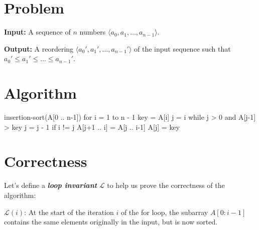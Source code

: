\documentclass[12pt]{article}
\begin{document}
\section*{Problem}

\noindent\textbf{Input:} A sequence of \(n\) numbers \(\langle a_0, a_1, \dots, a_{n-1} \rangle\).

\noindent\textbf{Output:} A reordering \(\langle a_0', a_1', \dots, a_{n-1}' \rangle\) of the input sequence such that \(a_0' \leq a_1' \leq \dots \leq a_{n-1}'\).

\section*{Algorithm}

\begin{pseudocode}
insertion-sort(A[0 .. n-1])
    for i = 1 to n - 1
        key = A[i]
        j = i
        while j > 0 and A[j-1] > key
            j = j - 1
        if i != j
            A[j+1 .. i] = A[j .. i-1]
            A[j] = key
\end{pseudocode}

\section*{Correctness}

Let's define a \textbf{\textit{loop invariant}} \(\mathcal{L}\) to help us prove the correctness of the algorithm:

\(\mathcal{L}(i)\): At the start of the iteration \(i\) of the for loop, the subarray \(A[0 : i-1]\) contains the same elements originally in the input, but is now sorted.
\end{document}
